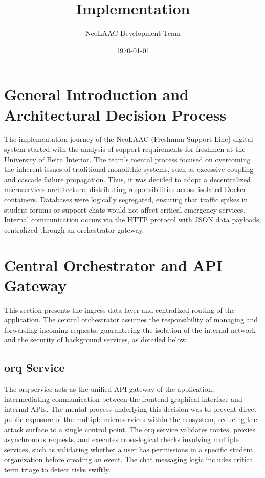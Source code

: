 \documentclass[12pt]{article}
\title{Implementation}
\author{NeoLAAC Development Team}
\date{\today}
\begin{document}
\maketitle

\section{General Introduction and Architectural Decision Process}
The implementation journey of the NeoLAAC (Freshman Support Line) digital system started with the analysis of support requirements for freshmen at the University of Beira Interior. The team's mental process focused on overcoming the inherent issues of traditional monolithic systems, such as excessive coupling and cascade failure propagation. Thus, it was decided to adopt a decentralized microservices architecture, distributing responsibilities across isolated Docker containers. Databases were logically segregated, ensuring that traffic spikes in student forums or support chats would not affect critical emergency services. Internal communication occurs via the HTTP protocol with JSON data payloads, centralized through an orchestrator gateway.

\section{Central Orchestrator and API Gateway}
This section presents the ingress data layer and centralized routing of the application. The central orchestrator assumes the responsibility of managing and forwarding incoming requests, guaranteeing the isolation of the internal network and the security of background services, as detailed below.

\subsection{orq Service}
The orq service acts as the unified API gateway of the application, intermediating communication between the frontend graphical interface and internal APIs. The mental process underlying this decision was to prevent direct public exposure of the multiple microservices within the ecosystem, reducing the attack surface to a single control point. The orq service validates routes, proxies asynchronous requests, and executes cross-logical checks involving multiple services, such as validating whether a user has permissions in a specific student organization before creating an event. The chat messaging logic includes critical term triage to detect risks swiftly.
\end{document}
